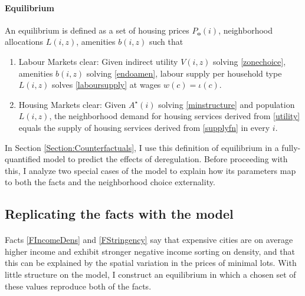 \documentclass[12pt]{article}
\begin{document}
	\paragraph*{Equilibrium} An equilibrium is defined as a set of housing prices $P_{\boldsymbol{o}}(i)$, neighborhood allocations $L(i, z)$, amenities $b(i, z)$ such that
	\begin{enumerate}
		\item Labour Markets clear: Given indirect utility $V(i, z)$ solving \eqref{zonechoice}, amenities $b(i, z)$ solving \eqref{endoamen}, labour supply per household type $L(i, z)$ solves \eqref{laboursupply} at wages $w(c) = \iota(c)$.
	
		\item Housing Markets clear: Given $A^{\star}(i)$ solving \eqref{minstructure} and population $L(i, z)$, the neighborhood demand for housing services derived from \eqref{utility} equals the supply of housing services derived from \eqref{supplyfn} in every $i$. 
	\end{enumerate}

	\noindent In Section \ref{Section:Counterfactuals}, I use this definition of equilibrium in a fully-quantified model to predict the effects of deregulation. Before proceeding with this, I analyze two special cases of the model to explain how its parameters map to both the facts and the neighborhood choice externality. 

	
\subsection{Replicating the facts with the model}\label{SubSection:ReplicatingFacts}
	\paragraph*{}
	Facts \ref{FIncomeDens} and \ref{FStringency} say that expensive cities are on average higher income and exhibit stronger negative income sorting on density, and that this can be explained by the spatial variation in the prices of minimal lots. With little structure on the model, I construct an equilibrium in which a chosen set of these values reproduce both of the facts. 
\end{document}
